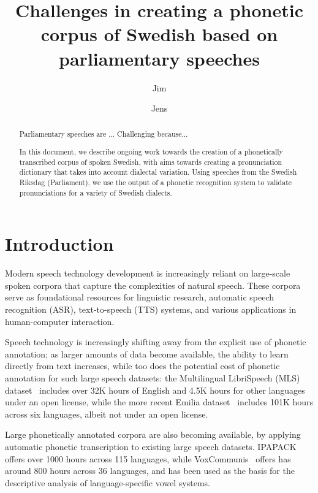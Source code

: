 \documentclass{Interspeech}
\title{Challenges in creating a phonetic corpus of Swedish based on parliamentary speeches}
\author[affiliation={1}]{Jim}{O'Regan}
\author[affiliation={1}]{Jens}{Edlund}
\affiliation{Division of Speech, Music and Hearing}{KTH Royal Institute of Technology}{Sweden}
\begin{document}
\maketitle

\begin{abstract}
Parliamentary speeches are ...
Challenging because...

In this document, we describe ongoing work towards the creation of a phonetically transcribed corpus of spoken Swedish, with aims towards
creating a pronunciation dictionary that takes into account dialectal
variation. Using speeches from the Swedish Riksdag (Parliament), we use the output of a phonetic recognition system to validate pronunciations for a variety of Swedish dialects.
\end{abstract}




\section{Introduction}

Modern speech technology development is increasingly reliant on large-scale spoken corpora that capture the complexities of natural speech. These corpora serve as foundational resources for linguistic research, automatic speech recognition (ASR), text-to-speech (TTS) systems, and various applications in human-computer interaction. 

Speech technology is increasingly shifting away from the explicit use of phonetic annotation; as larger amounts of data become available, the ability to learn directly from text increases, while too does the potential cost of phonetic annotation for such large speech datasets: the Multilingual LibriSpeech (MLS) dataset~\cite{pratap20_interspeech} includes over 32K hours of English and 4.5K hours for other languages under an open license, while the more recent Emilia dataset~\cite{he2024emilia} includes 101K hours across six languages, albeit not under an open license.

Large phonetically annotated corpora are also becoming available, by applying automatic phonetic transcription to existing large speech datasets. IPAPACK~\cite{zhu-etal-2024-taste} offers over 1000 hours across 115 languages, while VoxCommunis~\cite{ahn-chodroff-2022-voxcommunis} offers has around 800 hours across 36 languages, and has been used as the basis for the descriptive analysis of language-specific vowel systems.
\end{document}
